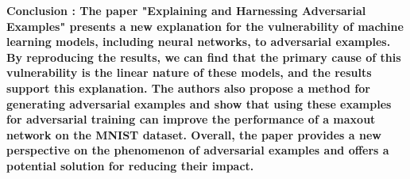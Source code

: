 
\textbf{Conclusion : The paper "Explaining and Harnessing Adversarial Examples" presents a new explanation for the vulnerability of machine learning models, including neural networks, to adversarial examples. By reproducing the results, we can find that the primary cause of this vulnerability is the linear nature of these models, and the results support this explanation. The authors also propose a method for generating adversarial examples and show that using these examples for adversarial training can improve the performance of a maxout network on the MNIST dataset. Overall, the paper provides a new perspective on the phenomenon of adversarial examples and offers a potential solution for reducing their impact.} \\

